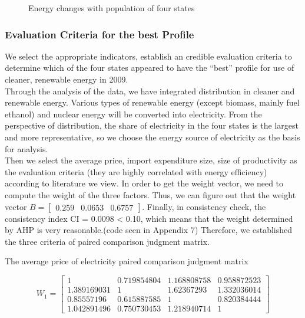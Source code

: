 \documentclass{mcmthesis}
\begin{document}
\begin{itemize}
\begin{figure}[h]
{\begin{minipage}{7cm}
		\end{minipage}}
		\caption{Energy changes with population of four states}                      %
		\label{fig:Population}                                       %
	\end{figure}
\end{itemize}
\subsubsection{Evaluation Criteria for the best Profile}
We select the appropriate indicators, establish an credible evaluation criteria to determine which of the four states appeared to have the “best” profile for use of cleaner, renewable energy in 2009.\\
Through the analysis of the data, we have integrated distribution in cleaner and renewable energy. Various types of renewable energy (except biomass, mainly fuel ethanol) and nuclear energy will be converted into electricity.
From the perspective of distribution, the share of electricity in the four states is the largest and more representative, so we choose the energy source of electricity as the basis for analysis.\\ Then we select the average price, import expenditure size, size of productivity as the evaluation criteria (they are highly correlated with energy efficiency) according to literature we view.\cite{evaluation}
In order to get the weight vector, we need to compute the weight of the
three factors.
Thus, we can figure out that the weight vector  $ B=\begin{bmatrix}
0.259&0.0653&0.6757
\end{bmatrix}  $.
Finally, in consistency check, the consistency index CI =  0.0098 < 0.10, which
means that the weight determined by AHP is very reasonable.\cite{AHP}(code seen in Appendix 7)
Therefore, we established the three criteria of paired comparison judgment matrix.\\
\begin{center}
	The average price of electricity paired comparison judgment matrix
\end{center}
\[W_{1}= \begin{bmatrix}
1	& 	0.719854804		& 1.168808758	& 	0.958872523\\
1.389169031		& 1		& 1.62367293	& 	1.332036014\\
0.85557196	& 	0.615887585	& 	1	& 	0.820384444\\
1.042891496	& 	0.750730453	& 	1.218940714		& 1
\end{bmatrix} 
\]
\end{document}
